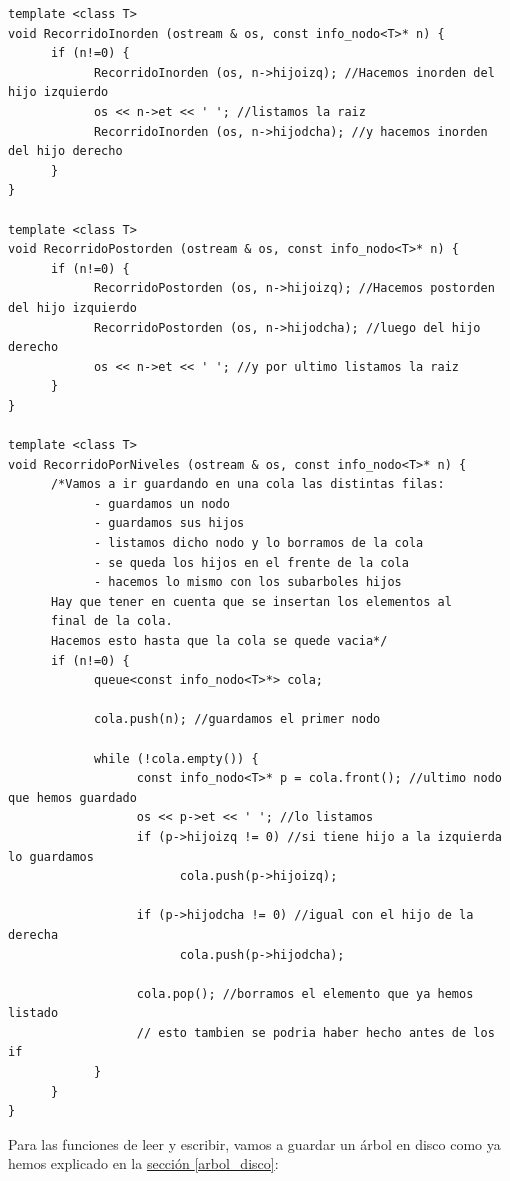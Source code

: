 \documentclass[10pt,a4paper,spanish]{report}
\begin{document}
\begin{verbatim}
template <class T>
void RecorridoInorden (ostream & os, const info_nodo<T>* n) {
      if (n!=0) {
            RecorridoInorden (os, n->hijoizq); //Hacemos inorden del hijo izquierdo
            os << n->et << ' '; //listamos la raiz
            RecorridoInorden (os, n->hijodcha); //y hacemos inorden del hijo derecho
      }
}

template <class T>
void RecorridoPostorden (ostream & os, const info_nodo<T>* n) {
      if (n!=0) {
            RecorridoPostorden (os, n->hijoizq); //Hacemos postorden del hijo izquierdo
            RecorridoPostorden (os, n->hijodcha); //luego del hijo derecho
            os << n->et << ' '; //y por ultimo listamos la raiz
      }
}

template <class T>
void RecorridoPorNiveles (ostream & os, const info_nodo<T>* n) {
      /*Vamos a ir guardando en una cola las distintas filas:
            - guardamos un nodo
            - guardamos sus hijos
            - listamos dicho nodo y lo borramos de la cola
            - se queda los hijos en el frente de la cola
            - hacemos lo mismo con los subarboles hijos
      Hay que tener en cuenta que se insertan los elementos al
      final de la cola.
      Hacemos esto hasta que la cola se quede vacia*/
      if (n!=0) {
            queue<const info_nodo<T>*> cola;

            cola.push(n); //guardamos el primer nodo

            while (!cola.empty()) {
                  const info_nodo<T>* p = cola.front(); //ultimo nodo que hemos guardado
                  os << p->et << ' '; //lo listamos
                  if (p->hijoizq != 0) //si tiene hijo a la izquierda lo guardamos
                        cola.push(p->hijoizq);

                  if (p->hijodcha != 0) //igual con el hijo de la derecha
                        cola.push(p->hijodcha);

                  cola.pop(); //borramos el elemento que ya hemos listado
                  // esto tambien se podria haber hecho antes de los if
            }
      }
}
\end{verbatim}

\noindent
Para las funciones de leer y escribir, vamos a guardar un árbol en disco como ya hemos explicado en la \hyperref[arbol_disco]{sección \ref*{arbol_disco}}:
\end{document}
